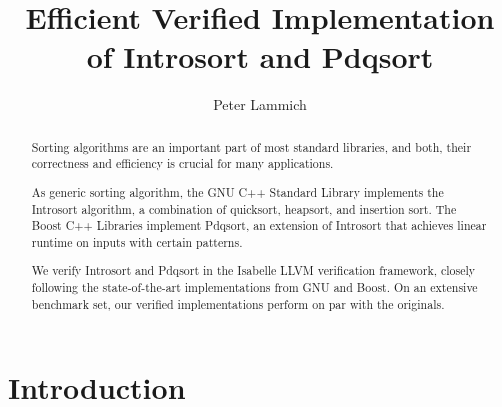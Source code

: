 \documentclass[runningheads]{llncs}
\begin{document}
\title{Efficient Verified Implementation of Introsort and Pdqsort}


\author{Peter Lammich}
%

\maketitle



\begin{abstract}
  Sorting algorithms are an important part of most standard libraries, and
  both, their correctness and efficiency is crucial for many applications.

  As generic sorting algorithm, the GNU C++ Standard Library implements the Introsort algorithm,
  a combination of quicksort, heapsort, and insertion sort. The Boost C++ Libraries implement Pdqsort,
  an extension of Introsort that achieves linear runtime on inputs with certain patterns.

  We verify Introsort and Pdqsort in the Isabelle LLVM verification framework,
  closely following the state-of-the-art implementations from GNU and Boost.
  On an extensive benchmark set, our verified implementations perform on par with the originals.
\end{abstract}






\section{Introduction}
\end{document}
